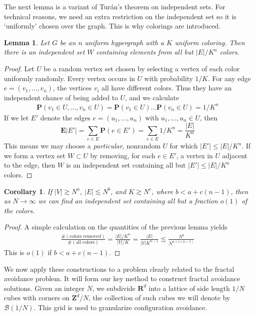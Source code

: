 \documentclass{article}
\theoremstyle{plain}
\newtheorem{lemma}{Lemma}
\newtheorem*{corollary}{Corollary}
\theoremstyle{plain}
\begin{document}
\begin{multicols}{2}
The next lemma is a variant of Tur\'{a}n's theorem on independent sets. For technical reasons, we need an extra restriction on the independent set so it is `uniformly' chosen over the graph. This is why colorings are introduced.

\begin{lemma}
	Let $G$ be an $n$ uniform hypergraph with a $K$ uniform coloring. Then there is an independent set $W$ containing elements from all but $|E|/K^n$ colors.
\end{lemma}
\begin{proof}
	Let $U$ be a random vertex set chosen by selecting a vertex of each color uniformly randomly. Every vertex occurs in $U$ with probability $1/K$. For any edge $e = (v_1, \dots, v_n)$, the vertices $v_i$ all have different colors. Thus they have an independent chance of being added to $U$, and we calculate
	\begin{align*}
		\mathbf{P}(v_1 \in U, \dots, v_n \in U) = \mathbf{P}(v_1 \in U) \dots \mathbf{P}(v_n \in U) = 1/K^n
	\end{align*}
	If we let $E'$ denote the edges $e = (u_1, \dots, u_n)$ with $u_1, \dots, u_n \in U$, then
	\[ \mathbf{E}|E'| = \sum_{e \in E} \mathbf{P}(e \in E') = \sum_{e \in E} 1/K^n = \frac{|E|}{K^n} \]
	This means we may choose a {\it particular}, nonrandom $U$ for which $|E'| \leq |E|/K^n$. If we form a vertex set $W \subset U$ by removing, for each $e \in E'$, a vertex in $U$ adjacent to the edge, then $W$ is an independent set containing all but $|E'| \leq |E|/K^n$ colors.
\end{proof}

\begin{corollary}
	If $|V| \gtrsim N^a$, $|E| \lesssim N^b$, and $K \gtrsim N^c$, where $b < a + c(n-1)$, then as $N \to \infty$ we can find an independent set containing all but a fraction $o(1)$ of the colors.
\end{corollary}
\begin{proof}
	A simple calculation on the quantities of the previous lemma yields
	\begin{align*}
		\frac{\# ( \text{colors removed} )}{\# ( \text{all colors} )} = \frac{|E|/K^n}{|V|/K} = \frac{|E|}{|V|K^{n-1}} \lesssim \frac{N^b}{N^{a + c(n-1)}}
	\end{align*}
	This is $o(1)$ if $b < a + c(n-1)$.
\end{proof}

We now apply these constructions to a problem clearly related to the fractal avoidance problem. It will form our key method to construct fractal avoidance solutions. Given an integer $N$, we subdivide $\mathbf{R}^d$ into a lattice of side length $1/N$ cubes with corners on $\mathbf{Z}^d/N$, the collection of such cubes we will denote by $\mathcal{B}(1/N)$. This grid is used to granularize configuration avoidance.


\end{multicols}
\end{document}
